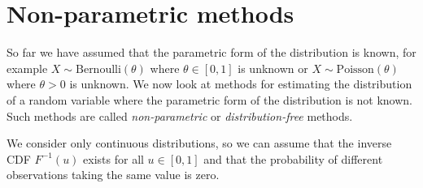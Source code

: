 
\chapter{Non-parametric methods}\label{chap:nonparametric}

%
So far we have assumed that the parametric form of the distribution is known, for example $X\sim\text{Bernoulli}(\theta)$ where $\theta\in[0,1]$ is unknown or $X\sim\text{Poisson}(\theta)$ where $\theta>0$ is unknown. We now look at methods for estimating the distribution of a random variable where the parametric form of the distribution is not known. Such methods are called \emph{non-parametric} or \emph{distribution-free} methods.

\smallskip
We consider only continuous distributions, so we can assume that the inverse CDF $F^{-1}(u)$ exists for all $u\in[0,1]$ and that the probability of different observations taking the same value is zero.






